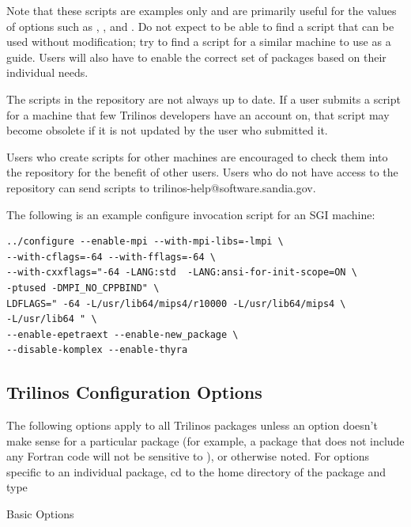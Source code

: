 \begin{enumerate}
Note that these scripts
are examples only and are primarily useful for the values of options such as
, ,
and .  Do not expect to be able to find a
script that can be used without modification; try to find a script for a
similar machine to use as a guide.  Users will also have to enable
the correct set of packages based on their individual needs.

The scripts in the
repository are not always up to date.  If a user submits a script for a
machine that few Trilinos developers have an account on, that script may
become obsolete if it is not updated by the user who submitted it.

Users who create scripts for other machines are encouraged to check them into
the repository for the benefit of other users.  Users who do not have access to
the repository can send scripts to trilinos-help@software.sandia.gov.

The following is an example configure invocation script for an SGI machine:

\begin{verbatim}
../configure --enable-mpi --with-mpi-libs=-lmpi \
--with-cflags=-64 --with-fflags=-64 \
--with-cxxflags="-64 -LANG:std  -LANG:ansi-for-init-scope=ON \
-ptused -DMPI_NO_CPPBIND" \
LDFLAGS=" -64 -L/usr/lib64/mips4/r10000 -L/usr/lib64/mips4 \
-L/usr/lib64 " \
--enable-epetraext --enable-new_package \
--disable-komplex --enable-thyra
\end{verbatim}
\end{enumerate}

\subsection{Trilinos Configuration Options}
\label{subsect:TrilinosConfigOptions}
The following options apply to all Trilinos packages unless
an option doesn't make sense for a particular package (for example, a
package that does not include any Fortran code will not be sensitive to
), or otherwise noted.  For options specific to
an individual package, cd to the home directory of the
package and type 

Basic Options

